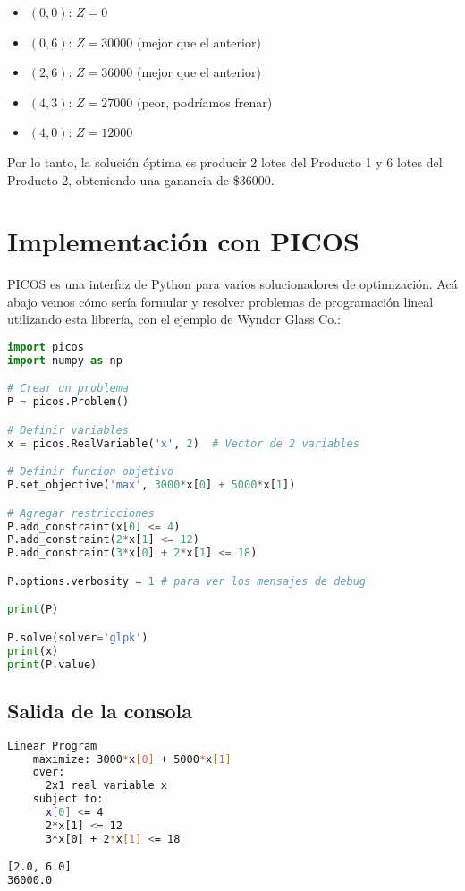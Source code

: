 \documentclass[12pt]{article}
\begin{document}
\begin{itemize}
    \item $(0,0)$: $Z = 0$
    \item $(0,6)$: $Z = 30000$ (mejor que el anterior)
    \item $(2,6)$: $Z = 36000$ (mejor que el anterior)
    \item $(4,3)$: $Z = 27000$ (peor, podríamos frenar)
    \item $(4,0)$: $Z = 12000$
\end{itemize}

Por lo tanto, la solución óptima es producir 2 lotes del Producto 1 y 6 lotes del Producto 2, obteniendo una ganancia de \$36000.


\section{Implementación con PICOS}
PICOS es una interfaz de Python para varios solucionadores de optimización. Acá abajo vemos cómo sería formular y resolver problemas de programación lineal utilizando esta librería, con el ejemplo de Wyndor Glass Co.:

\begin{lstlisting}[language=Python]
import picos
import numpy as np

# Crear un problema
P = picos.Problem()

# Definir variables
x = picos.RealVariable('x', 2)  # Vector de 2 variables

# Definir funcion objetivo
P.set_objective('max', 3000*x[0] + 5000*x[1])

# Agregar restricciones
P.add_constraint(x[0] <= 4)
P.add_constraint(2*x[1] <= 12)
P.add_constraint(3*x[0] + 2*x[1] <= 18)

P.options.verbosity = 1 # para ver los mensajes de debug

print(P)

P.solve(solver='glpk')
print(x)
print(P.value)
\end{lstlisting}

\subsection{Salida de la consola}

\begin{lstlisting}[language=bash,backgroundcolor=\color{black},basicstyle=\color{white}\ttfamily,numbers=none]
Linear Program
    maximize: 3000*x[0] + 5000*x[1]
    over:     
      2x1 real variable x
    subject to:
      x[0] <= 4
      2*x[1] <= 12 
      3*x[0] + 2*x[1] <= 18

[2.0, 6.0]
36000.0
\end{lstlisting}
\end{document}
